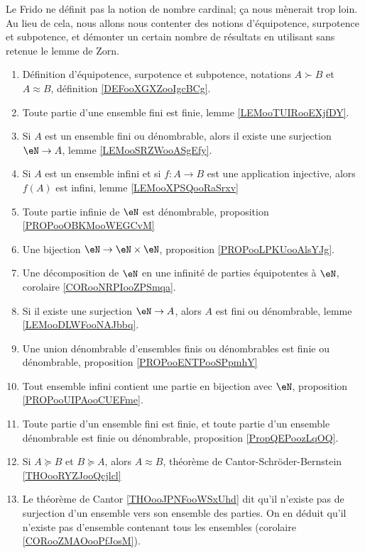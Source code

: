 Le Frido ne définit pas la notion de nombre cardinal; ça nous mènerait trop loin. Au lieu de cela, nous allons nous contenter des notions d'équipotence, surpotence et subpotence, et démonter un certain nombre de résultats en utilisant sans retenue le lemme de Zorn.
\begin{enumerate}
    \item
        Définition d'équipotence, surpotence et subpotence, notations \( A\succ B\) et \( A\approx B\), définition \ref{DEFooXGXZooIgcBCg}.
    \item
    Toute partie d'une ensemble fini est finie, lemme \ref{LEMooTUIRooEXjfDY}.
\item
Si \( A\) est un ensemble fini ou dénombrable, alors il existe une surjection \( \eN\to A\), lemme \ref{LEMooSRZWooASgEfy}.
\item
    Si \( A\) est un ensemble infini et si \( f\colon A\to B\) est une application injective, alors \( f(A)\) est infini, lemme \ref{LEMooXPSQooRaSrxv}
\item
    Toute partie infinie de \( \eN\) est dénombrable, proposition \ref{PROPooOBKMooWEGCvM}
\item
    Une bijection \( \eN\to \eN\times \eN\), proposition \ref{PROPooLPKUooAlsYJg}.
\item
    Une décomposition de \( \eN\) en une infinité de parties équipotentes à \( \eN\), corolaire \ref{CORooNRPIooZPSmqa}.
\item
    Si il existe une surjection \( \eN\to A\), alors \( A\) est fini ou dénombrable, lemme \ref{LEMooDLWFooNAJbbq}.
\item
    Une union dénombrable d'ensembles finis ou dénombrables est finie ou dénombrable, proposition \ref{PROPooENTPooSPpmhY}
\item
    Tout ensemble infini contient une partie en bijection avec \( \eN\), proposition \ref{PROPooUIPAooCUEFme}.
\item
    Toute partie d'un ensemble fini est finie, et toute partie d'un ensemble dénombrable est finie ou dénombrable, proposition \ref{PropQEPoozLqOQ}.
\item
    Si \( A\succeq B\) et \( B\succeq A\), alors \( A\approx B\), théorème de Cantor-Schröder-Bernstein \ref{THOooRYZJooQcjlcl}
\item
    Le théorème de Cantor \ref{THOooJPNFooWSxUhd} dit qu'il n'existe pas de surjection d'un ensemble vers son ensemble des parties. On en déduit qu'il n'existe pas d'ensemble contenant tous les ensembles (corolaire \ref{CORooZMAOooPfJosM}).

\end{enumerate}
